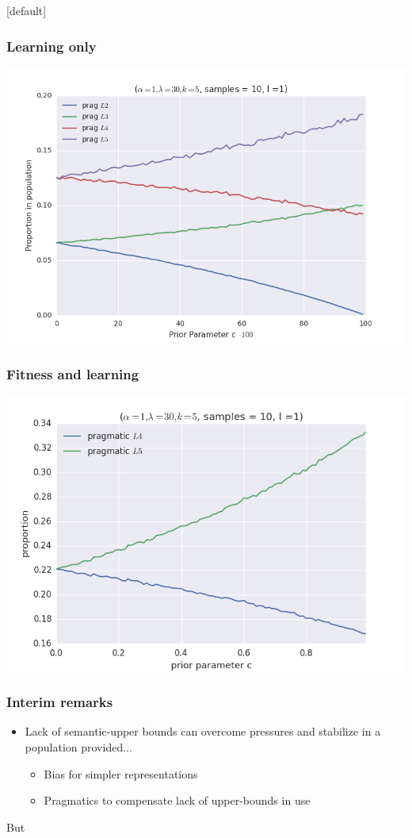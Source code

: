 \documentclass{beamer} %
\makeatletter
\newenvironment{withoutheadline}{
        \setbeamertemplate{headline}[default]
        \def\beamer@entrycode{\vspace*{-\headheight}}
    }{}
\makeatother
\begin{document}
\begin{withoutheadline}
\begin{frame}
\frametitle{Learning only}
\includegraphics[width=\linewidth,height=\textheight,keepaspectratio]{07learning}

\end{frame}

\begin{frame}
	\frametitle{Fitness and learning}

\includegraphics[width=\linewidth,height=\textheight,keepaspectratio]{03cost-with-l1}

\end{frame}

\begin{frame}
  \frametitle{Interim remarks}
  \begin{itemize}
	\item Lack of semantic-upper bounds can overcome pressures and stabilize in a population provided...
	  \begin{itemize}
		\item Bias for simpler representations
		\item Pragmatics to compensate lack of upper-bounds in use
	  \end{itemize}
  \end{itemize}
\pause
  But


\end{frame}
\end{withoutheadline}
\end{document}
